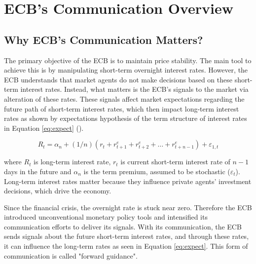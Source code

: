 \section{ECB's Communication Overview}

\subsection{Why ECB's Communication Matters?}
The primary objective of the ECB is to maintain price stability. The main tool to achieve this is by manipulating short-term overnight interest rates. However, the ECB understands that market agents do not make decisions based on these short-term interest rates. Instead, what matters is the ECB's signals to the market via alteration of these rates. These signals affect market expectations regarding the future path of short-term interest rates, which then impact long-term interest rates as shown by expectations hypothesis of the term structure of interest rates in Equation \ref{eq:expect} (\cite{blinder2008}).

\begin{equation}
    \label{eq:expect}
    R_{t} = \alpha_{n} + (1/n)(r_{t} + r_{t+1}^{e} + r_{t+2}^{e} + \dots + r_{t+n-1}^{e}) + \varepsilon_{1,t}
\end{equation}

\vspace{-16pt}

where $R_{t}$ is long-term interest rate, $r_{t}$ is current short-term interest rate of $n-1$ days in the future and $\alpha_{n}$ is the term premium, assumed to be stochastic ($\varepsilon_{t}$). Long-term interest rates matter because they influence private agents' investment decisions, which drive the economy. 

Since the financial crisis, the overnight rate is stuck near zero. Therefore the ECB introduced unconventional monetary policy tools and intensified its communication efforts to deliver its signals. With its communication, the ECB sends signals about the future short-term interest rates, and through these rates, it can influence the long-term rates as seen in Equation \ref{eq:expect}. This form of communication is called "forward guidance".
 

